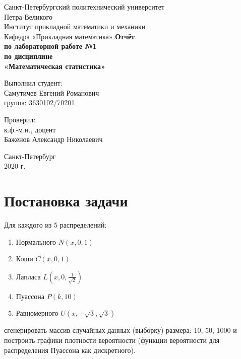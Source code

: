 \documentclass[12pt,a4paper]{article}
\begin{document}
	
\begin{titlepage}
	\begin{center}		
		\vfill	
		Санкт-Петербургский политехнический университет \\
		Петра Великого\\
		\vskip 1cm
		Институт прикладной математики и механики \\
		Кафедра «Прикладная математика»
		\vfill
		\textbf{Отчёт\\
			по лабораторной работе №1\\
			по дисциплине\\
			«Математическая статистика»\\}
		\vfill
	\end{center}
	\vfill
	\hfill
	\begin{minipage}{0.4\textwidth}
		Выполнил студент:\\
		Самутичев Евгений Романович\\
		группа: 3630102/70201\\
	\end{minipage}
	\vfill
	\hfill 
	\begin{minipage}{0.4\textwidth}
		Проверил:\\
		к.ф.-м.н., доцент\\
		Баженов Александр Николаевич\
	\end{minipage}
	\vfill
	\begin{center}
		Санкт-Петербург\\2020 г.
	\end{center}
\end{titlepage}

\tableofcontents
\listoffigures
\pagebreak

\section{Постановка задачи}
Для каждого из 5 распределений:

\begin{enumerate}
	\item Нормального $N(x, 0, 1)$
	\item Коши $C(x, 0, 1)$
	\item Лапласа $L(x, 0, \frac{1}{\sqrt{2}})$
	\item Пуассона $P(k, 10)$
	\item Равномерного $U(x, -\sqrt{3}, \sqrt{3})$	
\end{enumerate}

сгенерировать массив случайных данных (выборку) размера: 10, 50, 1000 и построить графики плотности вероятности (функции вероятности для распределения Пуассона как дискретного).
\end{document}
